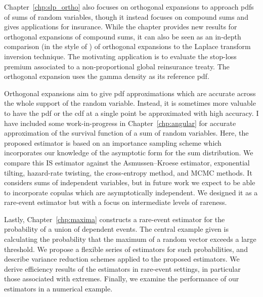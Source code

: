Chapter~\ref{chp:slp_ortho} also focuses on orthogonal expansions to approach pdfs of sums of random variables, though it instead focuses on compound sums and gives applications for insurance. While the chapter provides new results for orthogonal expansions of compound sums, it can also be seen as an in-depth comparison (in the style of \cite{embrechts2009panjer}) of orthogonal expansions to the Laplace transform inversion technique. The motivating application is to evaluate the stop-loss premium associated to a non-proportional global reinsurance treaty. The orthogonal expansion uses the gamma density as its reference pdf.


Orthogonal expansions aim to give pdf approximations which are accurate across the whole support of the random variable. Instead, it is sometimes more valuable to have the pdf or the cdf at a single point be approximated with high accuracy. I have included some work-in-progress in Chapter~\ref{chp:angular} for accurate approximation of the survival function of a sum of random variables. Here, the proposed estimator is based on an importance sampling scheme which incorporates our knowledge of the asymptotic form for the sum distribution. We compare this IS estimator against the Asmussen--Kroese estimator, exponential tilting, hazard-rate twisting, the cross-entropy method, and MCMC methods. It considers sums of independent variables, but in future work we expect to be able to incorporate copulas which are asymptotically independent. We designed it as a rare-event estimator but with a focus on intermediate levels of rareness.

Lastly, Chapter~\ref{chp:maxima} constructs a rare-event estimator for the probability of a union of dependent events. The central example given is calculating the probability that the maximum of a random vector exceeds a large threshold. We propose a flexible series of estimators for such probabilities, and describe variance reduction schemes applied to the proposed estimators. We derive efficiency results of the estimators in rare-event settings, in particular those associated with extremes. Finally, we examine the performance of our estimators in a numerical example.
